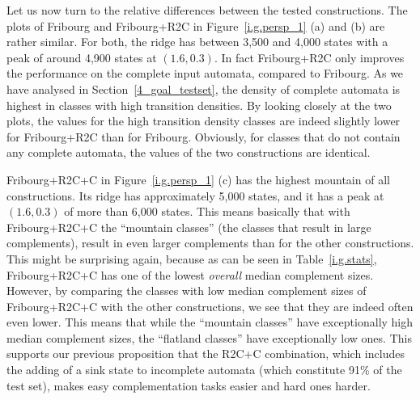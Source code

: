 Let us now turn to the relative differences between the tested constructions. The plots of Fribourg and Fribourg+R2C in Figure~\ref{i.g.persp_1} (a) and (b) are rather similar. For both, the ridge has between 3,500 and 4,000 states with a peak of around 4,900 states at $(1.6, 0.3)$. In fact Fribourg+R2C only improves the performance on the complete input automata, compared to Fribourg. As we have analysed in Section~\ref{4_goal_testset}, the density of complete automata is highest in classes with high transition densities. By looking closely at the two plots, the values for the high transition density classes are indeed slightly lower for Fribourg+R2C than for Fribourg. Obviously, for classes that do not contain any complete automata, the values of the two constructions are identical.

Fribourg+R2C+C in Figure~\ref{i.g.persp_1} (c) has the highest mountain of all constructions. Its ridge has approximately 5,000 states, and it has a peak at $(1.6,0.3)$ of more than 6,000 states. This means basically that with Fribourg+R2C+C the ``mountain classes'' (the classes that result in large complements), result in even larger complements than for the other constructions. This might be surprising again, because as can be seen in Table~\ref{i.g.stats}, Fribourg+R2C+C has one of the lowest \textit{overall} median complement sizes. However, by comparing the classes with low median complement sizes of Fribourg+R2C+C with the other constructions, we see that they are indeed often even lower. This means that while the ``mountain classes'' have exceptionally high median complement sizes, the ``flatland classes'' have exceptionally low ones. This supports our previous proposition that the R2C+C combination, which includes the adding of a sink state to incomplete automata (which constitute 91\% of the \goal{} test set), makes easy complementation tasks easier and hard ones harder.



